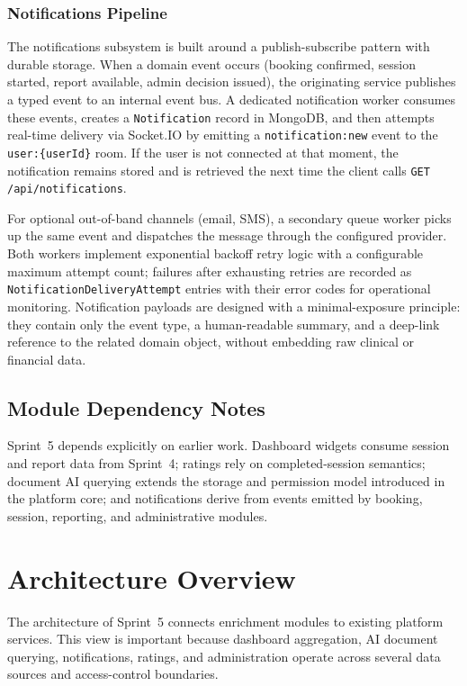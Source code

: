 \documentclass[a4paper,12pt]{report}
\begin{document}
\subsubsection*{Notifications Pipeline}
 
The notifications subsystem is built around a publish-subscribe pattern with durable storage.
When a domain event occurs (booking confirmed, session started, report available, admin
decision issued), the originating service publishes a typed event to an internal event bus.
A dedicated notification worker consumes these events, creates a \texttt{Notification} record
in MongoDB, and then attempts real-time delivery via Socket.IO by emitting a
\texttt{notification:new} event to the \texttt{user:\{userId\}} room. If the user is not
connected at that moment, the notification remains stored and is retrieved the next time
the client calls \texttt{GET /api/notifications}.
 
For optional out-of-band channels (email, SMS), a secondary queue worker picks up the same
event and dispatches the message through the configured provider. Both workers implement
exponential backoff retry logic with a configurable maximum attempt count; failures after
exhausting retries are recorded as \texttt{NotificationDeliveryAttempt} entries with their
error codes for operational monitoring. Notification payloads are designed with a
minimal-exposure principle: they contain only the event type, a human-readable summary, and
a deep-link reference to the related domain object, without embedding raw clinical or
financial data.
\subsection{Module Dependency Notes}

Sprint~5 depends explicitly on earlier work. Dashboard widgets consume session and report data
from Sprint~4; ratings rely on completed-session semantics; document AI querying extends the
storage and permission model introduced in the platform core; and notifications derive from
events emitted by booking, session, reporting, and administrative modules.

\section{Architecture Overview}
\label{sec:sprint5-architecture}

The architecture of Sprint~5 connects enrichment modules to existing platform services. This
view is important because dashboard aggregation, AI document querying, notifications, ratings,
and administration operate across several data sources and access-control boundaries.
\end{document}
